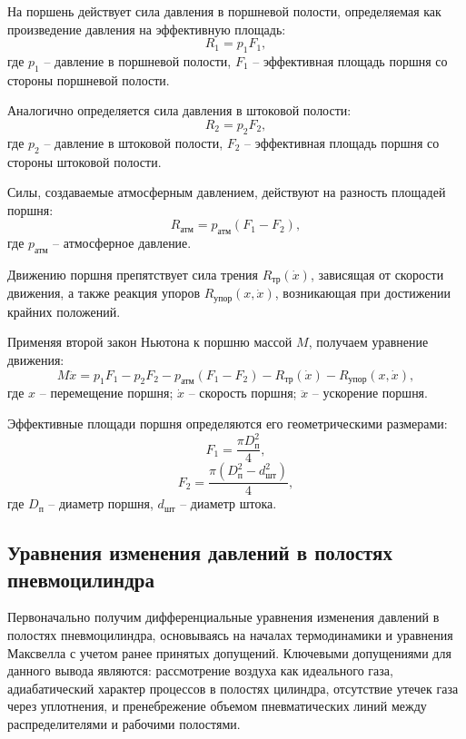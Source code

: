 На поршень действует сила давления в поршневой полости, определяемая как произведение давления на эффективную площадь:
\begin{equation}
R_1 = p_1F_1,
\end{equation}
где $p_1$ -- давление в поршневой полости, $F_1$ -- эффективная площадь поршня со стороны поршневой полости.

Аналогично определяется сила давления в штоковой полости:
\begin{equation}
R_2 = p_2F_2,
\end{equation}
где $p_2$ -- давление в штоковой полости, $F_2$ -- эффективная площадь поршня со стороны штоковой полости.

Силы, создаваемые атмосферным давлением, действуют на разность площадей поршня:
\begin{equation}
R_\text{атм} = p_\text{атм}(F_1 - F_2),
\end{equation}
где $p_\text{атм}$ -- атмосферное давление.

Движению поршня препятствует сила трения $R_\text{тр}(\dot{x})$, зависящая от скорости движения, а также реакция упоров $R_\text{упор}(x,\dot{x})$, возникающая при достижении крайних положений.

Применяя второй закон Ньютона к поршню массой $M$, получаем уравнение движения:
\begin{equation}
M\ddot{x} = p_1F_1 - p_2F_2 - p_\text{атм}(F_1 - F_2) - R_\text{тр}(\dot{x}) - R_\text{упор}(x,\dot{x}),
\end{equation}
где $x$ -- перемещение поршня; $\dot{x}$ -- скорость поршня; $\ddot{x}$ -- ускорение поршня.

Эффективные площади поршня определяются его геометрическими размерами:
\begin{equation}
F_1 = \frac{\pi D_{\text{п}}^2}{4},
\end{equation}
\begin{equation}
F_2 = \frac{\pi(D_{\text{п}}^2 - d_{\text{шт}}^2)}{4},
\end{equation}
где $D_{\text{п}}$ -- диаметр поршня, $d_{\text{шт}}$ -- диаметр штока.

\subsection{Уравнения изменения давлений в полостях пневмоцилиндра}\label{sec:ch2/sec2/subsec2}

Первоначально получим дифференциальные уравнения изменения давлений в
полостях пневмоцилиндра, основываясь на началах термодинамики
и уравнения Максвелла с учетом ранее принятых допущений.
Ключевыми допущениями для данного вывода являются: рассмотрение
воздуха как идеального газа, адиабатический характер процессов в полостях
цилиндра, отсутствие утечек газа через уплотнения, и пренебрежение объемом
пневматических линий между распределителями и рабочими полостями.

